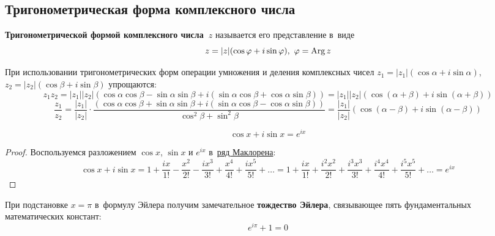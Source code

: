 \subsection{Тригонометрическая форма комплексного числа}
\textbf{Тригонометрической формой комплексного числа~$z$} называется его представление в~виде
\begin{equation*}
z = |z|(\cos \varphi + i\sin \varphi), \ \varphi = \operatorname{Arg} z
\end{equation*}

При использовании тригонометрических форм операции умножения и деления комплексных чисел
$z_1 = |z_1|(\cos \alpha + i\sin \alpha)$, $z_2 = |z_2|(\cos \beta + i\sin \beta)$ упрощаются:
\begin{equation*}
z_1 z_2 = |z_1| |z_2|(\cos \alpha \cos \beta - \sin \alpha \sin \beta + i(\sin \alpha \cos \beta + \cos \alpha \sin \beta)) =
|z_1| |z_2|(\cos (\alpha + \beta) + i\sin (\alpha + \beta))
\end{equation*}
\begin{equation*}
\frac{z_1}{z_2} = \frac{|z_1|}{|z_2|} \cdot
\frac{(\cos \alpha \cos \beta + \sin \alpha \sin \beta + i(\sin \alpha \cos \beta - \cos \alpha \sin \beta))}
{\cos^2 \beta + \sin^2 \beta} =
\frac{|z_1|}{|z_2|} (\cos (\alpha - \beta) + i\sin (\alpha - \beta))
\end{equation*}

\begin{theorem}
\begin{equation*}
\cos x + i\sin x = e^{ix}
\end{equation*}
\end{theorem}
\begin{proof}
Воспользуемся разложением $\cos x$, $\sin x$ и $e^{ix}$ в~\hyperref[eq:Maclaurin_series]{ряд Маклорена}:
\begin{equation*}
\cos x + i\sin x = 1 + \frac{ix}{1!} - \frac{x^2}{2!} - \frac{ix^3}{3!} + \frac{x^4}{4!} + \frac{ix^5}{5!} + \ldots =
1 + \frac{ix}{1!} + \frac{i^2 x^2}{2!} + \frac{i^3 x^3}{3!} + \frac{i^4 x^4}{4!} + \frac{i^5 x^5}{5!} + \ldots = e^{ix}
\end{equation*}
\end{proof}

При подстановке $x = \pi$ в~формулу Эйлера получим замечательное \textbf{тождество Эйлера}, связывающее пять фундаментальных математических констант:
\begin{equation*}
e^{i\pi} + 1 = 0
\end{equation*}

